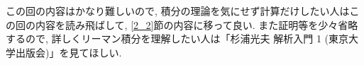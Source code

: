 \documentclass[dvipdfmx,a4paper,11pt]{article}
\theoremstyle{definition}
\begin{document}
 この回の内容はかなり難しいので, 積分の理論を気にせず計算だけしたい人はこの回の内容を読み飛ばして, \ref{2_2}節の内容に移って良い.
 また証明等を少々省略するので, 詳しくリーマン積分を理解したい人は「杉浦光夫 解析入門 1 (東京大学出版会)」を見てほしい.

 
\end{document}
